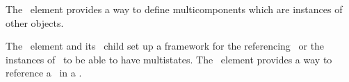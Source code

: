 The \ListOfSpeciesTypeInstances\ \mBlockChangedBegin{\revTwentyTwentyMarch}element\mBlockChangedEnd{\revTwentyTwentyMarch} provides a way to define multicomponents which are instances of other  objects. 

The \ListOfSpeciesFeatureTypes\ \mBlockChangedBegin{\revTwentyTwentyMarch}element\mBlockChangedEnd{\revTwentyTwentyMarch} and its \SpeciesFeatureType\ \mBlockChangedBegin{\revTwentyTwentyMarch}child\mBlockChangedEnd{\revTwentyTwentyMarch} set up a framework for the referencing \species\ or the instances of \speciesTypes\ to be able to have multistates. The \ListOfSpeciesTypeComponentIndexes\ \mBlockChangedBegin{\revTwentyTwentyMarch}element\mBlockChangedEnd{\revTwentyTwentyMarch} provides \mBlockChangedBegin{\revTwentyTwentyMarch}a way\mBlockChangedEnd{\revTwentyTwentyMarch} to reference \mBlockChangedBegin{\revTwentyTwentyMarch}a\mBlockChangedEnd{\revTwentyTwentyMarch} \component\ in a \speciesType. 

